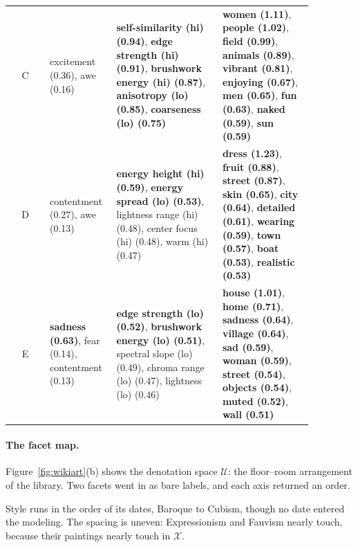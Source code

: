 \begin{table}[p]
\begin{tabular}{@{}c p{0.22\linewidth} p{0.35\linewidth} p{0.3\linewidth}@{}}
        \addlinespace
        C                          & excitement (0.36), awe (0.16)                                                                      & \textbf{self-similarity (hi) (0.94)}, \textbf{edge strength (hi) (0.91)}, \textbf{brushwork energy (hi) (0.87)}, \textbf{anisotropy (lo) (0.85)}, \textbf{coarseness (lo) (0.75)} & \textbf{women (1.11)}, \textbf{people (1.02)}, \textbf{field (0.99)}, \textbf{animals (0.89)}, \textbf{vibrant (0.81)}, \textbf{enjoying (0.67)}, \textbf{men (0.65)}, \textbf{fun (0.63)}, \textbf{naked (0.59)}, \textbf{sun (0.59)}     \\
        \addlinespace
        D                          & contentment (0.27), awe (0.13)                                                                     & \textbf{energy height (hi) (0.59)}, \textbf{energy spread (lo) (0.53)}, lightness range (hi) (0.48), center focus (hi) (0.48), warm (hi) (0.47)                                   & \textbf{dress (1.23)}, \textbf{fruit (0.88)}, \textbf{street (0.87)}, \textbf{skin (0.65)}, \textbf{city (0.64)}, \textbf{detailed (0.61)}, \textbf{wearing (0.59)}, \textbf{town (0.57)}, \textbf{boat (0.53)}, \textbf{realistic (0.53)} \\
        \addlinespace
        E                          & \textbf{sadness (0.63)}, fear (0.14), contentment (0.13)                                           & \textbf{edge strength (lo) (0.52)}, \textbf{brushwork energy (lo) (0.51)}, spectral slope (lo) (0.49), chroma range (lo) (0.47), lightness (lo) (0.46)                            & \textbf{house (1.01)}, \textbf{home (0.71)}, \textbf{sadness (0.64)}, \textbf{village (0.64)}, \textbf{sad (0.59)}, \textbf{woman (0.59)}, \textbf{street (0.54)}, \textbf{objects (0.54)}, \textbf{muted (0.52)}, \textbf{wall (0.51)}    \\
        \bottomrule
    \end{tabular}
\end{table}


\paragraph{The facet map.}
Figure~\ref{fig:wikiart}(b) shows the denotation space $\mathcal{U}$:
the floor--room arrangement of the library. Two facets went in as bare
labels, and each axis returned an order.

Style runs in the order of its dates, Baroque to Cubism, though no
date entered the modeling. The spacing is uneven: Expressionism and
Fauvism nearly touch, because their paintings nearly touch in
$\mathcal{X}$.

